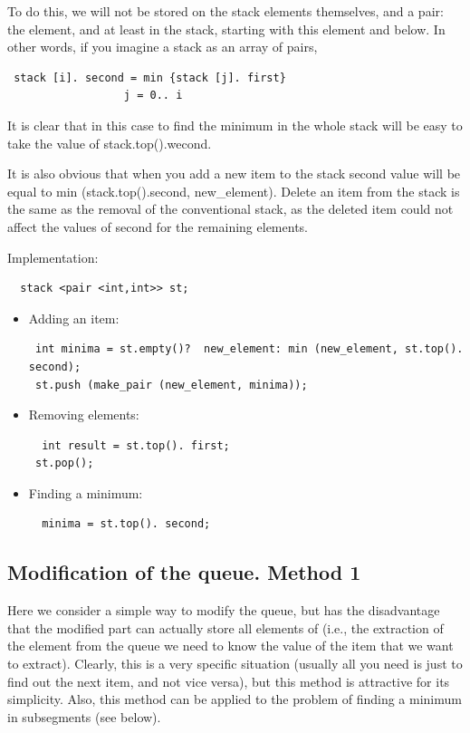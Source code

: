 To do this, we will not be stored on the stack elements themselves, and a pair: the element, and at least in the stack, starting with this element and below. In other words, if you imagine a stack as an array of pairs,

\begin{verbatim}
 stack [i]. second = min {stack [j]. first}
                  j = 0.. i 
\end{verbatim}
It is clear that in this case to find the minimum in the whole stack will be easy to take the value of stack.top().wecond.

It is also obvious that when you add a new item to the stack second value will be equal to min (stack.top().second, new\_element). Delete an item from the stack is the same as the removal of the conventional stack, as the deleted item could not affect the values ​​of second for the remaining elements.

Implementation:

\begin{verbatim}
  stack <pair <int,int>> st; 
\end{verbatim}

\begin{itemize}
\item Adding an item: \begin{verbatim}
 int minima = st.empty()?  new_element: min (new_element, st.top(). second);
 st.push (make_pair (new_element, minima)); 
\end{verbatim}
\item Removing elements: \begin{verbatim}
  int result = st.top(). first;
 st.pop(); 
\end{verbatim}
\item Finding a minimum: \begin{verbatim}
  minima = st.top(). second; 
\end{verbatim}
\end{itemize}

\subsection{ Modification of the queue. Method 1 }
Here we consider a simple way to modify the queue, but has the disadvantage that the modified part can actually store all elements of (i.e., the extraction of the element from the queue we need to know the value of the item that we want to extract). Clearly, this is a very specific situation (usually all you need is just to find out the next item, and not vice versa), but this method is attractive for its simplicity. Also, this method can be applied to the problem of finding a minimum in subsegments (see below).

